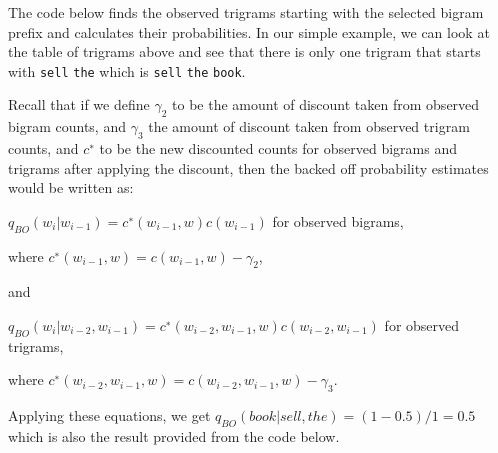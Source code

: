 \documentclass[
]{article}
\begin{document}
The code below finds the observed trigrams starting with the selected
bigram prefix and calculates their probabilities. In our simple example,
we can look at the table of trigrams above and see that there is only
one trigram that starts with \texttt{sell} \texttt{the} which is
\texttt{sell} \texttt{the} \texttt{book}.

Recall that if we define \(\gamma_2\) to be the amount of discount taken
from observed bigram counts, and \(\gamma_3\) the amount of discount
taken from observed trigram counts, and \(c^∗\) to be the new discounted
counts for observed bigrams and trigrams after applying the discount,
then the backed off probability estimates would be written as:

\(q_{BO}(w_i|w_{i−1})=c^∗(w_{i−1},w)c(w_{i−1})\) for observed bigrams,

where \(c^∗(w_{i−1},w)=c(w_{i−1},w)−\gamma_2\),

and

\(q_{BO}(w_i|w_{i−2},w_{i−1})=c^∗(w_{i−2},w_{i−1},w)c(w_{i−2},w_{i−1})\)
for observed trigrams,

where \(c^∗(w_{i−2},w_{i−1},w)=c(w_{i−2},w_{i−1},w)−\gamma_3\).

Applying these equations, we get \(q_{BO}(book|sell,the)=(1−0.5)/1=0.5\)
which is also the result provided from the code below.
\end{document}
